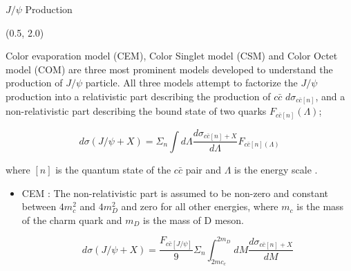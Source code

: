 \documentclass[10pt, xcolor={dvipsnames}, aspectratio = 169]{beamer}
\newcommand{\citeme}[1]{{\tiny \footfullcite{#1}}}
\newcommand{\jpsi}{$J/\psi$ }
\begin{document}
%
%


\begin{frame}{\jpsi Production}
\begin{textblock}{14.0}(0.5, 2.0)

Color evaporation model (CEM), Color Singlet model (CSM) and Color Octet model (COM) are three most prominent models
developed to understand the production of \jpsi particle. All three models attempt to factorize the \jpsi production
into a relativistic part describing the production of $c\bar{c}$ $d\sigma_{c\bar{c}[n]}$, and a non-relativistic part
describing the bound state of two quarks $F_{c\bar{c}[n]}(\Lambda)$;

\begin{equation*}
d\sigma (J/\psi+X) = \Sigma_{n} \int d\Lambda \frac{d\sigma_{c\bar{c}[n]+X}}{d\Lambda} F_{c\bar{c}[n](\Lambda)}
\end{equation*}

where $[n]$ is the quantum state of the $c\bar{c}$ pair and $\Lambda$ is the energy scale \citeme{Kempel:2011et}.

\begin{itemize}

\item CEM : The non-relativistic part is assumed to be non-zero and constant between $4m_{c}^{2}$ and $4m_{D}^{2}$ and
zero for all other energies, where $m_{c}$ is the mass of the charm quark and $m_{D}$  is the mass of D meson.

\begin{equation*}
d\sigma (J/\psi+X) = \frac{F_{c\bar{c}[J/\psi]}}{9} \Sigma_{n} \int_{2mc_{c}}^{2m_{D}} dM \frac{d\sigma_{c\bar{c}[n] + X}}{dM}
\end{equation*}

\end{itemize}

\end{textblock}
\end{frame}
\end{document}
